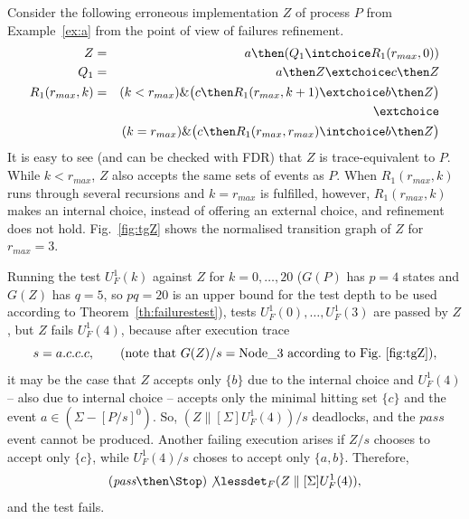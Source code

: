 \begin{example}
\label{ex:uf1tests} Consider the following erroneous implementation $Z$ of
process $P$ from Example~\ref{ex:a} from the point of view of failures
refinement.
\begin{eqnarray*}
Z & = & a \then (Q_1 \intchoice R_1(r_{max},0))
\\
Q_1 & = & a\then Z \extchoice c\then Z
\\
R_1(r_{max},k) & = & (k < r_{max}) \& \big( c\then R_1(r_{max},k+1)\extchoice b\then Z  \big)
\\ & & \extchoice
\\ & & (k = r_{max}) \& \big( c\then R_1(r_{max},r_{max})\intchoice b\then Z  \big)
\end{eqnarray*}
It is easy to see (and can be checked with FDR) that $Z$ is trace-equivalent
to $P$. While $k < r_{max}$, $Z$ also accepts the same sets of events as $P$.
When $R_1(r_{max},k)$ runs through several recursions and $k = r_{max}$ is
fulfilled, however, $R_1(r_{max},k)$ makes an internal choice, instead of
offering an external choice, and refinement does not hold.
Fig.~\ref{fig:tgZ} shows the normalised transition graph of $Z$ for $r_{max}
= 3$.

Running the test $U_F^1(k)$ against $Z$ for $k=0,\dots,20$ ($G(P)$ has $p =
4$ states and $G(Z)$ has $q=5$, so $pq=20$ is an upper bound for the test
depth to be used according to Theorem~\ref{th:failurestest}), tests
$U_F^1(0),\dots, U_F^1(3)$ are passed by $Z$, but $Z$ fails $U_F^1(4)$,
because after  execution trace
\[
s = a.c.c.c, \qquad\text{(note that $G(Z)/s = \text{Node\_3}$ according to Fig.~\ref{fig:tgZ})},
\]
it may be the case that $Z$ accepts only $\{b\}$ due to the internal choice
and $U_F^1(4)$ -- also due to internal choice -- accepts only the minimal
hitting set $\{ c \}$ and the event $a\in (\Sigma - [P/s]^0)$. So,
$(Z\parallel[\Sigma] U_F^1(4))/s$ deadlocks, and the $pass$ event cannot be
produced. Another failing execution arises if $Z/s$ chooses to accept only
$\{c \}$, while $U_F^1(4)/s$ choses to accept only $\{a,b\}$. Therefore,
\[
(\epass\then \Stop)\not\lessdet_F  (Z\parallel[\Sigma] U_F^1(4)),
\]
and the test fails.
\xbox
\end{example}




